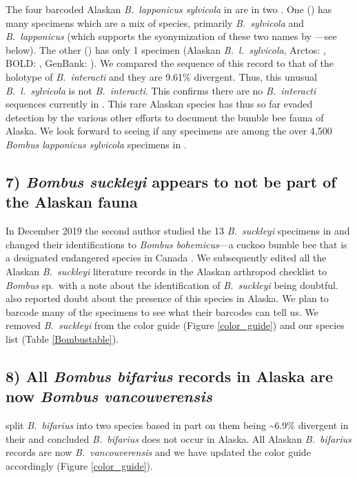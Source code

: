 \begin{multicols}{2}
The four  barcoded  Alaskan \textit{B.\ lapponicus sylvicola} in  are in two . One  () has many specimens which are a mix of species, primarily \textit{B.\ sylvicola} and \textit{B.\ lapponicus} (which supports the syonymization of these two names by \citet{Martinetetal2019}---see below). The other  () has only 1 specimen (Alaskan \textit{B.\ l.\ sylvicola}, Arctos: , BOLD: , GenBank: ). We compared the  sequence of this record to that of the holotype of \textit{B.\ interacti} and they are 9.61\% divergent. Thus, this unusual \textit{B.\ l.\ sylvicola} is not \textit{B.\ interacti}. This confirms there are no \textit{B.\ interacti} sequences currently in . This rare Alaskan species has thus so far evaded detection by the various other efforts to document the bumble bee fauna of Alaska. We look forward to seeing if any specimens are among the over 4,500 \textit{Bombus lapponicus sylvicola} specimens in .

\subsection{7) \textit{Bombus suckleyi} appears to not be part of the Alaskan fauna}

In December 2019 the second author studied the 13 \textit{B.\ suckleyi} specimens in  and changed their identifications to \textit{Bombus bohemicus}---a cuckoo bumble bee that is a designated endangered species in Canada \citep{Colla2017}. We subsequently edited all the Alaskan \textit{B.\ suckleyi} literature records in the  Alaskan arthropod checklist to \textit{Bombus} sp.\ with a note about the identification of \textit{B.\ suckleyi} being doubtful. \citet{Pampelletal2015} also reported doubt about the presence of this species in Alaska. We plan to  barcode many of the  specimens to see what their  barcodes can tell us. We removed \textit{B.\ suckleyi} from the color guide (Figure \ref{color_guide}) and our species list (Table \ref{Bombustable}). 

\subsection{8) All \textit{Bombus bifarius} records in Alaska are now \textit{Bombus vancouverensis}}

\citet{Ghisbainetal2020} split \textit{B.\ bifarius} into two species based in part on them being \textasciitilde{}6.9\% divergent in their  and concluded \textit{B.\ bifarius} does not occur in Alaska. All Alaskan \textit{B.\ bifarius} records are now \textit{B.\ vancouverensis} and we have updated the color guide accordingly (Figure \ref{color_guide}).


\end{multicols}
